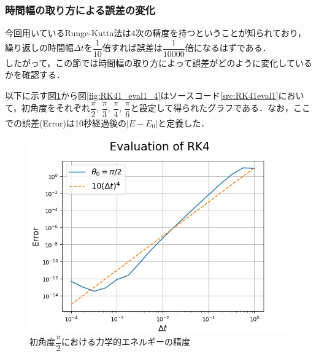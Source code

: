 \documentclass[a4paper,11pt]{jsarticle}
\begin{document}
\subsubsection{時間幅の取り方による誤差の変化}
今回用いているRunge-Kutta法は4次の精度を持つということが知られており，繰り返しの時間幅\(\Delta t\)を\(\dfrac{1}{10}\)倍すれば誤差は\(\dfrac{1}{10000}\)倍になるはずである．\\
したがって，この節では時間幅の取り方によって誤差がどのように変化しているかを確認する．\par
以下に示す図\ref{fig:RK41_eval1_1}から図\ref{fig:RK41_eval1_4}はソースコード\ref{src:RK41eval1}において，初角度をそれぞれ\(\dfrac{\pi}{2}\), \(\dfrac{\pi}{3}\), \(\dfrac{\pi}{4}\), \(\dfrac{\pi}{6}\)と設定して得られたグラフである．なお，ここでの誤差(Error)は10秒経過後の\(|E-E_0|\)と定義した．
\begin{figure}[H]
  \begin{center}
    \includegraphics[scale=0.8]{figure/RK41/evaluation1/pi2_2021-2-9-222927.jpeg}
    \caption{初角度\(\dfrac{\pi}{2}における力学的エネルギーの精度\)}
    \label{fig:RK41_eval1_1}
  \end{center}
\end{figure}
\end{document}
